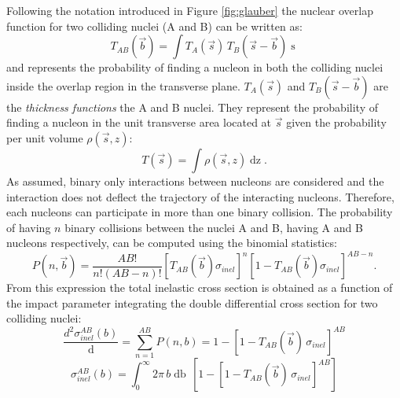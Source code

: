 Following the notation introduced in Figure \ref{fig:glauber} the nuclear overlap function for two colliding
nuclei (A and B) can be written as:
\begin{equation} \label{eq:overlap}
    T_{AB}(\vec{b}) = \int T_{A}(\vec{s})\,T_{B}(\vec{s}-\vec{b}) \mathop{d^{2}s}
\end{equation}
and represents the probability of finding a nucleon in both the colliding nuclei inside the 
overlap region in the transverse plane.
$T_{A}(\vec{s})$ and $T_{B}(\vec{s}-\vec{b})$ are the \textit{thickness functions} the A and B
nuclei.
They represent the probability of finding a nucleon in the unit transverse area located at 
$\vec{s}\xspace$ given the probability per unit volume $\rho(\vec{s},z)$:
\begin{equation} \label{eq:thickfunc}
    T(\vec{s}) = \int \rho(\vec{s},z) \mathop{dz}.
\end{equation}
As assumed, binary only interactions between nucleons are considered and the interaction does not
deflect the trajectory of the interacting nucleons.
Therefore, each nucleons can participate in more than one binary collision. 
The probability of having $n$ binary collisions between the nuclei A and B, having A and B nucleons
respectively, can be computed using the binomial statistics:
\begin{equation} \label{eq:ABprob}
    P(n,\vec{b}) = \frac{AB!}{n! (AB-n)!}[T_{AB}(\vec{b})\sigma_{inel}]^{n} [1-T_{AB}(\vec{b})\sigma_{inel}]^{AB-n}.
\end{equation}
From this expression the total inelastic cross section is obtained as a function of the impact
parameter integrating the double differential cross section for two colliding nuclei:
\begin{equation} \label{eq:doublediff}
    \frac{d^{2} \sigma^{AB}_{inel}(b)}{\mathop{db^{2}}} = \sum_{n=1}^{AB} P(n,b)
    = 1 - [1-T_{AB}(\vec{b})\, \sigma_{inel}]^{AB}
\end{equation}
\begin{equation}
    \sigma^{AB}_{inel}(b) = \int_{0}^{\infty} 2 \pi \, b \mathop{db} \,
    [1 - [1-T_{AB}(\vec{b})\, \sigma_{inel}]^{AB}]
\end{equation}


